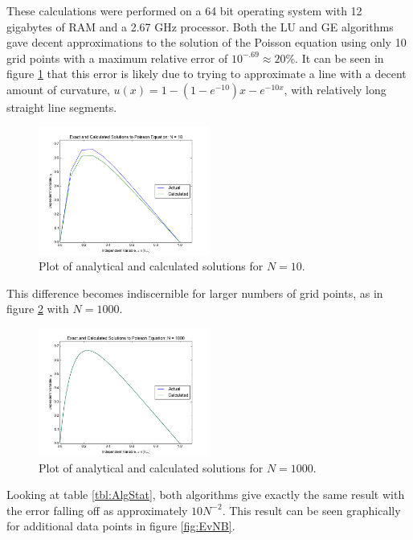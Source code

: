 \documentclass[a4paper,12pt]{report}
\begin{document}
These calculations were performed on a 64 bit operating system with 12 gigabytes of RAM and a 2.67 GHz processor. Both the LU and GE algorithms gave decent approximations to the solution of the Poisson equation using only 10 grid points with a maximum relative error of $10^{-.69}\approx20\%$. It can be seen in figure \ref{fig:SCGE10} that this error is likely due to trying to approximate a line with a decent amount of curvature, $u(x) = 1-(1-e^{-10})x-e^{-10x}$, with relatively long straight line segments. 

\begin{figure}
\centering
 \includegraphics[width=0.5\textwidth]{SolutionCoords_GDG_N10.png}
 \caption{Plot of analytical and calculated solutions for $N=10$.}
 \label{fig:SCGE10}
\end{figure}

This difference becomes indiscernible for larger numbers of grid points, as in figure \ref{fig:SCGE1000} with $N = 1000$.

\begin{figure}
\centering
 \includegraphics[width=0.5\textwidth]{SolutionCoords_GDG_N1000.png}
 \caption{Plot of analytical and calculated solutions for $N=1000$.}
 \label{fig:SCGE1000}
\end{figure}

Looking at table \ref{tbl:AlgStat}, both algorithms give exactly the same result with the error falling off as approximately $10N^{-2}$. This result can be seen graphically for additional data points in figure \ref{fig:EvNB}. 
\end{document}
